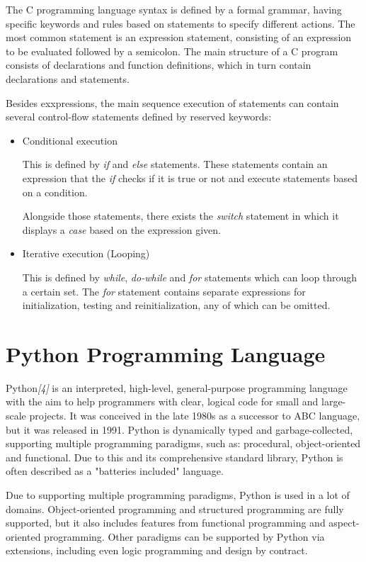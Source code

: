 \documentclass[12pt,a4paper,twoside]{report}
\begin{document}
 The C programming language syntax is defined by a formal grammar, having specific keywords and rules based on statements to specify different actions. The most common statement is an expression statement, consisting of an expression to be evaluated followed by a semicolon. The main structure of a C program consists of declarations and function definitions, which in turn contain declarations and statements. 
 
 Besides exxpressions, the main sequence execution of statements can contain several control-flow statements defined by reserved keywords:
  
 \begin{itemize}
 	\item Conditional execution 
 	
 		This is defined by \textit{if} and \textit{else} statements. These statements contain an expression that the \textit{if} checks if it is true or not and execute statements based on a condition.
 		
 		Alongside those statements, there exists the \textit{switch} statement in which it displays a \textit{case} based on the expression given.
 		
 	\item Iterative execution (Looping)
 	
 		This is defined by \textit{while}, \textit{do-while} and \textit{for} statements which can loop through a certain set. The \textit{for} statement contains separate expressions for initialization, testing and reinitialization, any of which can be omitted. 
 \end{itemize}


\section{Python Programming Language}

Python{\it[4]}  is an interpreted, high-level, general-purpose programming language with the aim to help programmers with clear, logical code for small and large-scale projects. It was conceived in the late 1980s as a successor to ABC language, but it was released in 1991. Python is dynamically typed and garbage-collected, supporting multiple programming paradigms, such as: procedural, object-oriented and functional. Due to this and its comprehensive standard library, Python is often described as a "batteries included" language. 

Due to supporting multiple programming paradigms, Python is used in a lot of domains. Object-oriented programming and structured programming are fully supported, but it also includes features from functional programming and aspect-oriented programming. Other paradigms can be supported by Python via extensions, including even logic programming and design by contract. 
\end{document}
